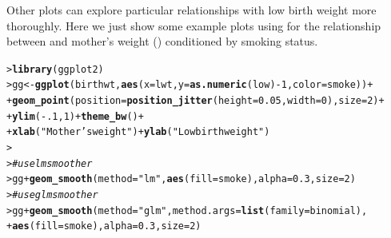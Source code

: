 \documentclass[10pt]{report}\usepackage[]{graphicx}\usepackage[]{color}
\makeatletter
\newcommand{\hlnum}[1]{\textcolor[rgb]{0.686,0.059,0.569}{#1}}%
\newcommand{\hlstr}[1]{\textcolor[rgb]{0.192,0.494,0.8}{#1}}%
\newcommand{\hlcom}[1]{\textcolor[rgb]{0.678,0.584,0.686}{\textit{#1}}}%
\newcommand{\hlopt}[1]{\textcolor[rgb]{0,0,0}{#1}}%
\newcommand{\hlstd}[1]{\textcolor[rgb]{0.345,0.345,0.345}{#1}}%
\newcommand{\hlkwb}[1]{\textcolor[rgb]{0.69,0.353,0.396}{#1}}%
\newcommand{\hlkwc}[1]{\textcolor[rgb]{0.333,0.667,0.333}{#1}}%
\newcommand{\hlkwd}[1]{\textcolor[rgb]{0.737,0.353,0.396}{\textbf{#1}}}%
\newenvironment{kframe}{%
 \def\at@end@of@kframe{}%
 \ifinner\ifhmode%
  \def\at@end@of@kframe{\end{minipage}}%
  \begin{minipage}{\columnwidth}%
 \fi\fi%
 \def\FrameCommand##1{\hskip\@totalleftmargin \hskip-\fboxsep
 \colorbox{shadecolor}{##1}\hskip-\fboxsep
     \hskip-\linewidth \hskip-\@totalleftmargin \hskip\columnwidth}%
 \MakeFramed {\advance\hsize-\width
   \@totalleftmargin\z@ \linewidth\hsize
   \@setminipage}}%
 {\par\unskip\endMakeFramed%
 \at@end@of@kframe}
\newenvironment{knitrout}{}{} %
\renewenvironment{knitrout}{\small\renewcommand{\baselinestretch}{.85}}{} %
\makeatother
\begin{document}
\begin{Exercises}
\begin{enumerate*}
\begin{ans}
\begin{knitrout}
\end{knitrout}
    Other plots can explore particular relationships with low birth weight more thoroughly.  Here we just show
    some example plots using  for the relationship between  and  mother's weight ()
    conditioned by smoking status.
\begin{knitrout}\footnotesize
{}\color{fgcolor}\begin{kframe}
\begin{alltt}
\hlstd{> }\hlkwd{library}\hlstd{(ggplot2)}
\hlstd{> }\hlstd{gg} \hlkwb{<-} \hlkwd{ggplot}\hlstd{(birthwt,} \hlkwd{aes}\hlstd{(}\hlkwc{x}\hlstd{=lwt,} \hlkwc{y}\hlstd{=}\hlkwd{as.numeric}\hlstd{(low)}\hlopt{-}\hlnum{1}\hlstd{,} \hlkwc{color}\hlstd{=smoke))} \hlopt{+}
\hlstd{+ }        \hlkwd{geom_point}\hlstd{(}\hlkwc{position}\hlstd{=}\hlkwd{position_jitter}\hlstd{(}\hlkwc{height}\hlstd{=}\hlnum{0.05}\hlstd{,} \hlkwc{width}\hlstd{=}\hlnum{0}\hlstd{),} \hlkwc{size}\hlstd{=}\hlnum{2}\hlstd{)} \hlopt{+}
\hlstd{+ }        \hlkwd{ylim}\hlstd{(}\hlopt{-}\hlnum{.1}\hlstd{,} \hlnum{1}\hlstd{)} \hlopt{+} \hlkwd{theme_bw}\hlstd{()} \hlopt{+}
\hlstd{+ }        \hlkwd{xlab}\hlstd{(}\hlstr{"Mother's weight"}\hlstd{)} \hlopt{+} \hlkwd{ylab}\hlstd{(}\hlstr{"Low birth weight"}\hlstd{)}
\hlstd{> }
\hlstd{> }\hlcom{# use lm smoother}
\hlstd{> }        \hlstd{gg} \hlopt{+} \hlkwd{geom_smooth}\hlstd{(}\hlkwc{method}\hlstd{=}\hlstr{"lm"}\hlstd{,} \hlkwd{aes}\hlstd{(}\hlkwc{fill}\hlstd{=smoke),} \hlkwc{alpha}\hlstd{=}\hlnum{0.3}\hlstd{,} \hlkwc{size}\hlstd{=}\hlnum{2}\hlstd{)}
\hlstd{> }\hlcom{# use glm smoother}
\hlstd{> }        \hlstd{gg} \hlopt{+} \hlkwd{geom_smooth}\hlstd{(}\hlkwc{method}\hlstd{=}\hlstr{"glm"}\hlstd{,} \hlkwc{method.args}\hlstd{=}\hlkwd{list}\hlstd{(}\hlkwc{family} \hlstd{= binomial),}
\hlstd{+ }                         \hlkwd{aes}\hlstd{(}\hlkwc{fill}\hlstd{=smoke),} \hlkwc{alpha}\hlstd{=}\hlnum{0.3}\hlstd{,} \hlkwc{size}\hlstd{=}\hlnum{2}\hlstd{)}
\end{alltt}
\end{kframe}


\end{knitrout}
\end{ans}
\end{enumerate*}
\end{Exercises}
\end{document}
